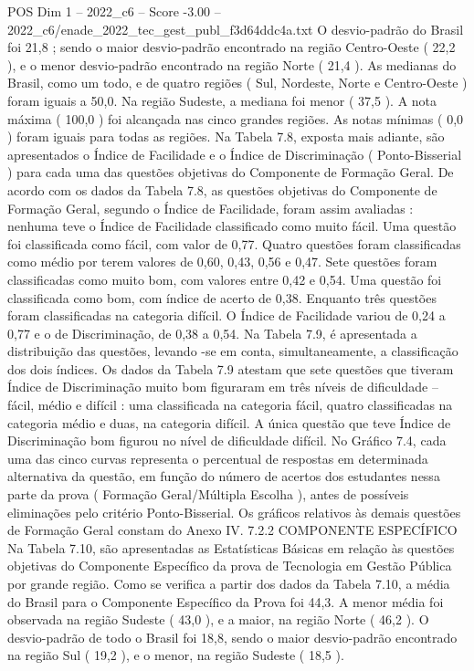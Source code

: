 \begin{textsample}{POS Dim 1 – 2022\_c6 – Score -3.00 – 2022\_c6/enade\_2022\_tec\_gest\_publ\_f3d64ddc4a.txt}
O desvio-padrão do Brasil foi 21,8 ; sendo o maior desvio-padrão encontrado na região Centro-Oeste ( 22,2 ), e o menor desvio-padrão encontrado na região Norte ( 21,4 ).
As medianas do Brasil, como um todo, e de quatro regiões ( Sul, Nordeste, Norte e Centro-Oeste ) foram iguais a 50,0.
Na região Sudeste, a mediana foi menor ( 37,5 ).
A nota máxima ( 100,0 ) foi alcançada nas cinco grandes regiões.
As notas mínimas ( 0,0 ) foram iguais para todas as regiões.
Na Tabela 7.8, exposta mais adiante, são apresentados o Índice de Facilidade e o Índice de Discriminação ( Ponto-Bisserial ) para cada uma das questões objetivas do Componente de Formação Geral.
De acordo com os dados da Tabela 7.8, as questões objetivas do Componente de Formação Geral, segundo o Índice de Facilidade, foram assim avaliadas : nenhuma teve o Índice de Facilidade classificado como muito fácil.
Uma questão foi classificada como fácil, com valor de 0,77.
Quatro questões foram classificadas como médio por terem valores de 0,60, 0,43, 0,56 e 0,47.
Sete questões foram classificadas como muito bom, com valores entre 0,42 e 0,54.
Uma questão foi classificada como bom, com índice de acerto de 0,38.
Enquanto três questões foram classificadas na categoria difícil.
O Índice de Facilidade variou de 0,24 a 0,77 e o de Discriminação, de 0,38 a 0,54.
Na Tabela 7.9, é apresentada a distribuição das questões, levando -se em conta, simultaneamente, a classificação dos dois índices.
Os dados da Tabela 7.9 atestam que sete questões que tiveram Índice de Discriminação muito bom figuraram em três níveis de dificuldade – fácil, médio e difícil : uma classificada na categoria fácil, quatro classificadas na categoria médio e duas, na categoria difícil.
A única questão que teve Índice de Discriminação bom figurou no nível de dificuldade difícil.
No Gráfico 7.4, cada uma das cinco curvas representa o percentual de respostas em determinada alternativa da questão, em função do número de acertos dos estudantes nessa parte da prova ( Formação Geral/Múltipla Escolha ), antes de possíveis eliminações pelo critério Ponto-Bisserial.
Os gráficos relativos às demais questões de Formação Geral constam do Anexo IV. 7.2.2 COMPONENTE ESPECÍFICO Na Tabela 7.10, são apresentadas as Estatísticas Básicas em relação às questões objetivas do Componente Específico da prova de Tecnologia em Gestão Pública por grande região.
Como se verifica a partir dos dados da Tabela 7.10, a média do Brasil para o Componente Específico da Prova foi 44,3.
A menor média foi observada na região Sudeste ( 43,0 ), e a maior, na região Norte ( 46,2 ).
O desvio-padrão de todo o Brasil foi 18,8, sendo o maior desvio-padrão encontrado na região Sul ( 19,2 ), e o menor, na região Sudeste ( 18,5 ).

\end{textsample}
